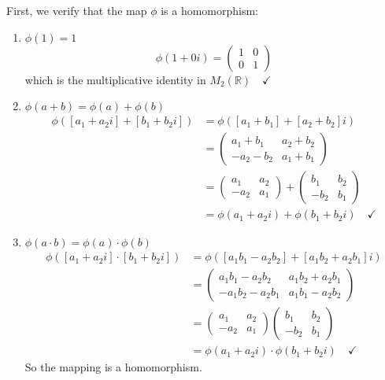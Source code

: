 \documentclass[12pt]{article}
\newcommand{\R}{\mathbb{R}}
\begin{document}
    \color{blue}
        First, we verify that the map $\phi$ is a homomorphism:
        \begin{enumerate}
            \item $\phi(1) = 1$
            \[\phi(1 + 0i) = \begin{pmatrix}
                1 & 0\\
                0 & 1
            \end{pmatrix}\]
            which is the multiplicative identity in $M_2(\R) \quad \checkmark$

            \item $\phi(a + b) = \phi(a) + \phi(b)$
            \begin{align*}
                \phi([a_1 + a_2i] + [b_1 + b_2i]) &= \phi([a_1 + b_1] + [a_2 + b_2]i)\\
                &=\begin{pmatrix}
                    a_1 + b_1 & a_2 + b_2\\
                    -a_2 - b_2 & a_1 + b_1
                \end{pmatrix} \\
                &= \begin{pmatrix}
                    a_1 & a_2\\
                    -a_2 & a_1
                \end{pmatrix} + \begin{pmatrix}
                    b_1 & b_2\\
                    -b_2 & b_1
                \end{pmatrix}\\
                &= \phi(a_1 + a_2i) + \phi(b_1 + b_2i) \quad \checkmark
            \end{align*}

            \item $\phi(a \cdot b) = \phi(a) \cdot \phi(b)$
            \begin{align*}
                \phi([a_1 + a_2i] \cdot [b_1 + b_2i]) &= \phi([a_1 b_1 - a_2 b_2] + [a_1b_2 + a_2b_1]i)\\
                &= \begin{pmatrix}
                    a_1 b_1 - a_2 b_2 & a_1b_2 + a_2b_1\\
                    -a_1b_2 - a_2b_1 & a_1b_1 - a_2b_2
                \end{pmatrix}\\
                &= \begin{pmatrix}
                    a_1 & a_2\\
                    -a_2 & a_1
                \end{pmatrix}\begin{pmatrix}
                    b_1 & b_2\\
                    -b_2 & b_1
                \end{pmatrix}\\
                &= \phi(a_1 + a_2i) \cdot \phi(b_1 + b_2i) \quad \checkmark
            \end{align*}
            So the mapping is a homomorphism. 


\end{enumerate}
\end{document}

